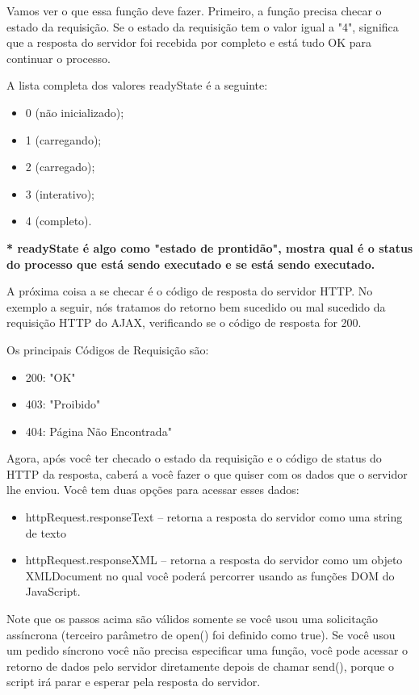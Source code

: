 \documentclass[12pt,a4paper]{article}
\begin{document}


Vamos ver o que essa função deve fazer. Primeiro, a função precisa checar o estado da requisição. Se o estado da requisição tem o valor igual a "4", significa que a resposta do servidor foi recebida por completo e está tudo OK para continuar o processo.



A lista completa dos valores readyState é a seguinte:

\begin{itemize}
\item 0 (não inicializado);
\item 1 (carregando);
\item 2 (carregado);
\item 3 (interativo);
\item 4 (completo).
\end{itemize}

\textbf{* readyState é algo como "estado de prontidão", mostra qual é o status do processo que
está sendo executado e se está sendo executado.}

A próxima coisa a se checar é o código de resposta do servidor HTTP. No exemplo a seguir, nós tratamos do retorno bem sucedido ou mal sucedido da requisição HTTP do AJAX, verificando se o código de resposta for 200.



Os principais Códigos de Requisição são:
\begin{itemize}
\item 200: "OK"
\item 403: "Proibido"
\item 404: Página Não Encontrada"
\end{itemize}

Agora, após você ter checado o estado da requisição e o código de status do HTTP da resposta, caberá a você fazer o que quiser com os dados que o servidor lhe enviou. Você tem duas opções para acessar esses dados:
\begin{itemize}


\item httpRequest.responseText – retorna a resposta do servidor como uma string de
texto
\item httpRequest.responseXML – retorna a resposta do servidor como um objeto
XMLDocument no qual você poderá percorrer usando as funções DOM do JavaScript.
\end{itemize}
Note que os passos acima são válidos somente se você usou uma solicitação assíncrona (terceiro parâmetro de open() foi definido como true). Se você usou um pedido síncrono
você não precisa especificar uma função, você pode acessar o retorno de dados pelo servidor diretamente depois de chamar send(), porque o script irá parar e esperar pela
resposta do servidor.
\end{document}
